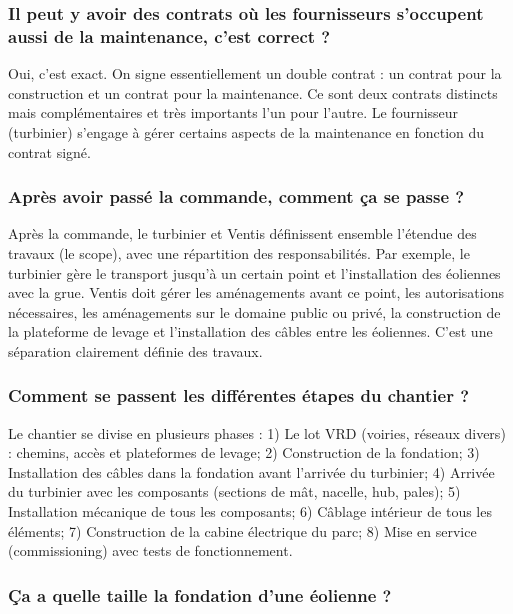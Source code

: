 \subsubsection{Il peut y avoir des contrats où les fournisseurs s'occupent aussi de la maintenance, c'est correct ?}

Oui, c'est exact. On signe essentiellement un double contrat : un contrat pour la construction et un contrat pour la maintenance. Ce sont deux contrats distincts mais complémentaires et très importants l'un pour l'autre. Le fournisseur (turbinier) s'engage à gérer certains aspects de la maintenance en fonction du contrat signé.

\subsubsection{Après avoir passé la commande, comment ça se passe ?}

Après la commande, le turbinier et Ventis définissent ensemble l'étendue des travaux (le scope), avec une répartition des responsabilités. Par exemple, le turbinier gère le transport jusqu'à un certain point et l'installation des éoliennes avec la grue. Ventis doit gérer les aménagements avant ce point, les autorisations nécessaires, les aménagements sur le domaine public ou privé, la construction de la plateforme de levage et l'installation des câbles entre les éoliennes. C'est une séparation clairement définie des travaux.

\subsubsection{Comment se passent les différentes étapes du chantier ?}

Le chantier se divise en plusieurs phases : 1) Le lot VRD (voiries, réseaux divers) : chemins, accès et plateformes de levage; 2) Construction de la fondation; 3) Installation des câbles dans la fondation avant l'arrivée du turbinier; 4) Arrivée du turbinier avec les composants (sections de mât, nacelle, hub, pales); 5) Installation mécanique de tous les composants; 6) Câblage intérieur de tous les éléments; 7) Construction de la cabine électrique du parc; 8) Mise en service (commissioning) avec tests de fonctionnement.

\subsubsection{Ça a quelle taille la fondation d'une éolienne ?}

